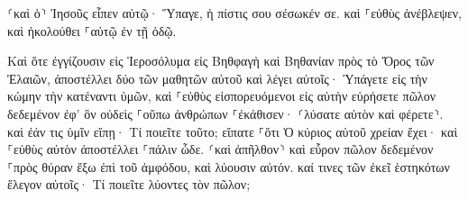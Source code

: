 \documentclass{openreader}
\begin{document}
⸂καὶ ὁ⸃ Ἰησοῦς εἶπεν αὐτῷ· Ὕπαγε, ἡ πίστις σου σέσωκέν σε. καὶ ⸀εὐθὺς ἀνέβλεψεν, καὶ ἠκολούθει ⸀αὐτῷ ἐν τῇ ὁδῷ. 

Καὶ ὅτε ἐγγίζουσιν εἰς Ἱεροσόλυμα εἰς Βηθφαγὴ καὶ Βηθανίαν πρὸς τὸ Ὄρος τῶν Ἐλαιῶν, ἀποστέλλει δύο τῶν μαθητῶν αὐτοῦ 
καὶ λέγει αὐτοῖς· Ὑπάγετε εἰς τὴν κώμην τὴν κατέναντι ὑμῶν, καὶ ⸀εὐθὺς εἰσπορευόμενοι εἰς αὐτὴν εὑρήσετε πῶλον δεδεμένον ἐφ’ ὃν οὐδεὶς ⸀οὔπω ἀνθρώπων ⸀ἐκάθισεν· ⸂λύσατε αὐτὸν καὶ φέρετε⸃. 
καὶ ἐάν τις ὑμῖν εἴπῃ· Τί ποιεῖτε τοῦτο; εἴπατε ⸀ὅτι Ὁ κύριος αὐτοῦ χρείαν ἔχει· καὶ ⸀εὐθὺς αὐτὸν ἀποστέλλει ⸀πάλιν ὧδε. 
⸂καὶ ἀπῆλθον⸃ καὶ εὗρον πῶλον δεδεμένον ⸀πρὸς θύραν ἔξω ἐπὶ τοῦ ἀμφόδου, καὶ λύουσιν αὐτόν. 
καί τινες τῶν ἐκεῖ ἑστηκότων ἔλεγον αὐτοῖς· Τί ποιεῖτε λύοντες τὸν πῶλον; 
\end{document}
